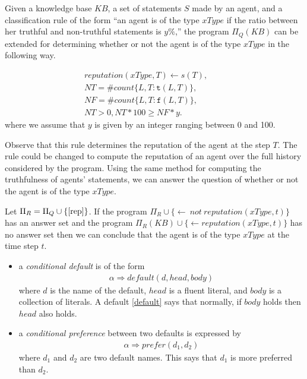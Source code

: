 \documentclass{article}
\newcommand{\memo}[1]{
  \ifthenelse {\boolean{includeMemo}}{\medskip\noindent\fbox{\begin{minipage}[b]{\dimexpr\linewidth-1em}#1\end{minipage}}\medskip\newline} 
}
\def\naf{\: {not} \:}
\begin{document}
Given a knowledge base $KB$, a set of statements $S$ made by an agent, and a classification rule of the form ``an agent is of the type $xType$ if the ratio  between her  truthful and non-truthful statements is $y\%$,'' the program $\Pi_Q(KB)$ can be extended for determining whether or not the agent is of the type $xType$ in the following way. 

\begin{align} 
reputation(xType, T) \leftarrow s(T),\quad\quad  \label{rep} \\
NT = \#count \{L,T : \mathtt{t}(L, T)\},  \:\: \nonumber \\
NF =  \#count \{L,T : \mathtt{f}(L, T)\}, \nonumber \\
NT > 0, NT*100  \ge NF*y.        \quad\quad \:\: \nonumber
\end{align}     
where we assume that $y$ is given by an integer ranging between 0 and 100. 

Observe that this rule determines the reputation of the agent at the step $T$. The rule could be changed to compute the reputation of an agent over the full history considered by the program. Using the same method for computing the truthfulness of agents' statements, we can 
answer the question of whether or not the agent is of the type $xType$. 

Let $\Pi_R  = \Pi_Q  \cup \{\eqref{rep}\}$. If the program  
$\Pi_R   \cup \{\leftarrow \naf reputation(xType, t)\}$ has an answer set and the program 
$\Pi_R(KB)  \cup \{\leftarrow reputation(xType, t)\}$ has no answer set then we can conclude that the agent is of the type $xType$ 
at the time step $t$. 

\fi



\iffalse 
\begin{itemize} 
\item a \emph{conditional default} is of the form 
\begin{align}\label{c:default}
\alpha \Rightarrow default(d, head, body)
\end{align} 
where $d$ is the name of the default, $head$ is a fluent literal, and $body$ is a collection of literals.  A default \eqref{default} says that normally, if $body$ holds then $head$ also holds. 
\item a \emph{conditional preference} between two defaults is expressed by 
\begin{align}\label{c:prefs}
\alpha \Rightarrow prefer(d_1, d_2)
\end{align} 
where $d_1$ and $d_2$ are two default names. This says that $d_1$ is more preferred than $d_2$. 

\end{itemize} 
\end{document}
